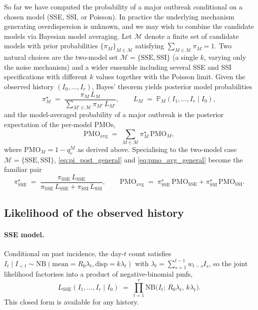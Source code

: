\documentclass{article}
\theoremstyle{definition}
\begin{document}
So far we have computed the probability of a major outbreak conditional on
a chosen model (SSE, SSI, or Poisson).  In practice the underlying
mechanism generating overdispersion is unknown, and we may wish to combine
the candidate models via Bayesian model averaging.  Let $\mathcal{M}$
denote a finite set of candidate models with prior probabilities
$\{\pi_M\}_{M \in \mathcal{M}}$ satisfying
$\sum_{M \in \mathcal{M}} \pi_M = 1$.  Two natural choices are the
two-model set $\mathcal{M} = \{\mathrm{SSE}, \mathrm{SSI}\}$ (a single
$k$, varying only the noise mechanism) and a wider ensemble including
several SSE and SSI specifications with different $k$ values together
with the Poisson limit.  Given the observed history $(I_0, \ldots, I_r)$,
Bayes' theorem yields posterior model probabilities
\begin{equation}\label{eq:pi_post_general}
  \pi_M^\star
  \;=\; \frac{\pi_M\, L_M}
  {\sum_{M' \in \mathcal{M}} \pi_{M'}\, L_{M'}},
  \qquad
  L_M \;=\; \mathbb{P}_M(I_1, \ldots, I_r \mid I_0),
\end{equation}
and the model-averaged probability of a major outbreak is the posterior
expectation of the per-model PMOs,
\begin{equation}\label{eq:pmo_avg_general}
  \mathrm{PMO}_\mathrm{avg}
  \;=\; \sum_{M \in \mathcal{M}} \pi_M^\star\,\mathrm{PMO}_M,
\end{equation}
where $\mathrm{PMO}_M = 1 - q_r^M$ as derived above.  Specialising to the
two-model case $\mathcal{M} = \{\mathrm{SSE}, \mathrm{SSI}\}$,
\eqref{eq:pi_post_general} and \eqref{eq:pmo_avg_general} become the
familiar pair
\begin{equation}\label{eq:pmo_avg_two_model}
  \pi_\mathrm{SSE}^\star
  \;=\; \frac{\pi_\mathrm{SSE}\, L_\mathrm{SSE}}
  {\pi_\mathrm{SSE}\, L_\mathrm{SSE} + \pi_\mathrm{SSI}\, L_\mathrm{SSI}},
  \qquad
  \mathrm{PMO}_\mathrm{avg}
  \;=\; \pi_\mathrm{SSE}^\star\,\mathrm{PMO}_\mathrm{SSE}
  + \pi_\mathrm{SSI}^\star\,\mathrm{PMO}_\mathrm{SSI}.
\end{equation}

\subsection{Likelihood of the observed history}
\label{sec:likelihood}

\paragraph{SSE model.}  Conditional on past incidence, the day-$t$ count
satisfies $I_t \mid I_{<t} \sim \mathrm{NB}(\text{mean} = R_0 \lambda_t,
\text{disp} = k \lambda_t)$ with
$\lambda_t = \sum_{s=1}^{t-1} w_{t-s} I_s$, so the joint likelihood
factorises into a product of negative-binomial pmfs,
\begin{equation}\label{eq:L_sse_general}
  L_\mathrm{SSE}(I_1, \ldots, I_r \mid I_0)
  \;=\; \prod_{t=1}^r \mathrm{NB}\!\bigl(I_t;\, R_0 \lambda_t,\,
  k\lambda_t\bigr).
\end{equation}
This closed form is available for any history.
\end{document}

